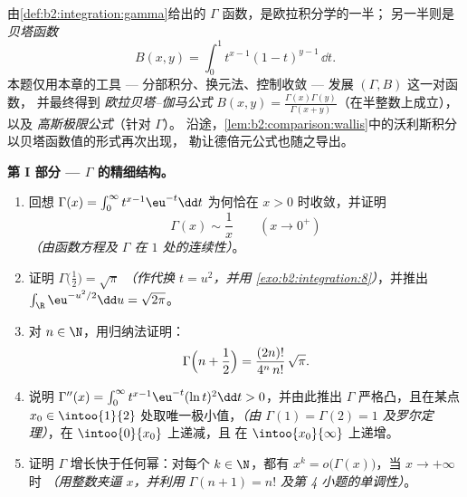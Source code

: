 \begin{problem}\label{pb:b2:integration:1}
由\cref{def:b2:integration:gamma}给出的 $\Gamma$ 函数，是欧拉积分学的一半；
另一半则是
\emph{贝塔函数}
\[
B(x, y) = \int_0^1 t^{x-1}(1 - t)^{y-1}\,\dd t .
\]
本题仅用本章的工具 --- 分部积分、换元法、控制收敛 --- 发展 $(\Gamma, B)$ 这一对函数，
并最终得到
\emph{欧拉贝塔–伽马公式}
$B(x,y) = \frac{\Gamma(x)\Gamma(y)}
{\Gamma(x+y)}$（在半整数上成立），以及
\emph{高斯极限公式}（针对 $\Gamma$）。
沿途，\cref{lem:b2:comparison:wallis}中的沃利斯积分以贝塔函数值的形式再次出现，
勒让德倍元公式也随之导出。

\medskip
\noindent\textbf{第 I 部分 --- $\Gamma$ 的精细结构。}
\begin{enumerate}
  \item 回想 $\Gamma(x) = \int_0^\infty t^{x-1}\eu^{-t}\dd
        t$ 为何恰在 $x > 0$ 时收敛，并证明
        \[
        \Gamma(x) \sim \frac1x \qquad (x \to 0^+)
        \]
        \emph{（由函数方程及 $\Gamma$ 在
        $1$ 处的连续性）}。
  \item 证明 $\Gamma\bigl(\tfrac12\bigr) = \sqrt\pi$
        \emph{（作代换 $t = u^2$，并用
        \cref{exo:b2:integration:8}）}，并推出
        $\int_\R \eu^{-u^2/2}\dd u = \sqrt{2\pi}$。
  \item 对 $n \in \N$，用归纳法证明：
        \[
        \Gamma\Bigl(n + \frac12\Bigr)
        = \frac{(2n)!}{4^n\,n!}\,\sqrt\pi .
        \]
  \item 说明 $\Gamma''(x) = \int_0^\infty
        t^{x-1}\eu^{-t}(\ln t)^2\dd t > 0$，并由此推出
        $\Gamma$ 严格凸，且在某点
        $x_0 \in \intoo{1}{2}$ 处取唯一极小值，\emph{（由 $\Gamma(1) = \Gamma(2)
        = 1$ 及罗尔定理）}，在 $\intoo{0}{x_0}$ 上递减，且
        在 $\intoo{x_0}{\infty}$ 上递增。
  \item 证明 $\Gamma$ 增长快于任何幂：对每个 $k \in
        \N$，都有 $x^k = o\bigl(\Gamma(x)\bigr)$，当 $x \to +\infty$ 时
        \emph{（用整数夹逼 $x$，并利用 $\Gamma(n+1)
        = n!$ 及第 4 小题的单调性）}。
\end{enumerate}


\end{problem}
